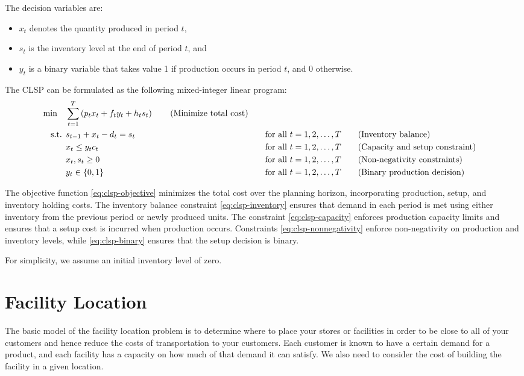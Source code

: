 The decision variables are:
\begin{itemize}
    \item \( x_t \) denotes the quantity produced in period \( t \),
    \item \( s_t \) is the inventory level at the end of period \( t \), and
    \item \( y_t \) is a binary variable that takes value 1 if production occurs in period \( t \), and 0 otherwise.
\end{itemize}

The CLSP can be formulated as the following mixed-integer linear program:
\begin{align}
\min \quad & \sum_{t=1}^{T} \left( p_t x_t + f_t y_t + h_t s_t \right)   \tag{Minimize total cost}\label{eq:clsp-objective} \\
\text{ s.t. }        & s_{t-1} + x_t - d_t = s_t &&\quad \text{for all } t = 1,2,\dots,T   \tag{Inventory balance}\label{eq:clsp-inventory} \\
    & x_t \leq y_t c_t &&\quad \text{for all } t = 1,2,\dots,T   \tag{Capacity and setup constraint}\label{eq:clsp-capacity} \\
    & x_t, s_t \geq 0 &&\quad \text{for all } t = 1,2,\dots,T   \tag{Non-negativity constraints}\label{eq:clsp-nonnegativity} \\
    & y_t \in \{0,1\} &&\quad \text{for all } t = 1,2,\dots,T   \tag{Binary production decision}\label{eq:clsp-binary}
\end{align}

The objective function \eqref{eq:clsp-objective} minimizes the total cost over the planning horizon, incorporating production, setup, and inventory holding costs. The inventory balance constraint \eqref{eq:clsp-inventory} ensures that demand in each period is met using either inventory from the previous period or newly produced units. The constraint \eqref{eq:clsp-capacity} enforces production capacity limits and ensures that a setup cost is incurred when production occurs. Constraints \eqref{eq:clsp-nonnegativity} enforce non-negativity on production and inventory levels, while \eqref{eq:clsp-binary} ensures that the setup decision is binary.

For simplicity, we assume an initial inventory level of zero.

\section{Facility Location}
\label{sec:facility-location}
The basic model of the facility location problem is to determine where to place your stores or facilities in order to be close to all of your customers and hence reduce the costs of transportation to your customers.  Each customer is known to have a certain demand for a product, and each facility has a capacity on how much of that demand it can satisfy.  We also need to consider the cost of building the facility in a given location.

